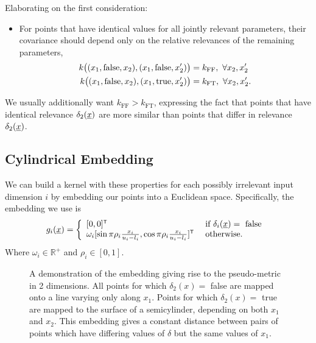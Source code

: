 \documentclass{article}
\newcommand{\vect}[1]{\underline{\smash{#1}}}
\renewcommand{\v}[1]{\vect{#1}}
\newcommand{\reals}{\mathds{R}}
\newcommand{\sX}{\mathcal{X}}
\newcommand{\br}{}%
\newcommand\transpose{{\textrm{\tiny{\sf{T}}}}}
\newcommand{\embeddingletter}{g}
\begin{document}
Elaborating on the first consideration:
%
\begin{itemize}[leftmargin=0.8cm]
\item For points that have identical values for all jointly relevant parameters, their covariance should depend only on the relative relevances of the remaining parameters,
\begin{align}
 k\bigl((x_1, \textnormal{false}, x_2), (x_1, \textnormal{false}, x_2') \bigr)
& = k_{\text{FF}},\ \forall x_2, x_2'\\
 k\bigl((x_1, \textnormal{false}, x_2), (x_1, \textnormal{true}, x_2') \bigr)
& = k_{\text{FT}},\ \forall x_2, x_2'.
\end{align}
\end{itemize}
We usually additionally want $k_{\text{FF}}>k_{\text{FT}}$, expressing the fact that points that have identical relevance $\delta_2({\v{x}})$ are more similar than points that differ in relevance $\delta_2({\v{x}})$.


\subsection{Cylindrical Embedding}
\vspace{-0.05in} 

We can build a kernel with these properties for each possibly irrelevant input dimension $i$ by embedding our points into a Euclidean space.  Specifically, the embedding we use is
%
%
%
\begin{equation}
\embeddingletter_i\br(\v{x}) = \left\{\begin{array}{ll}
[0,0]^\transpose & \textrm{ if } \delta_i(\v{x}) = \textrm{ false }\\
\omega_i [\sin{\pi\rho_i\frac{x_i}{u_i-l_i}}, \cos{\pi\rho_i\frac{x_i}{u_i-l_i}}]^\transpose & \textrm{ otherwise.}\end{array}\right.
\end{equation}
Where $\omega_i \in \mathbb{R}^+$ and $\rho_i \in [0,1]$.
%
\begin{figure}

\caption{A demonstration of the embedding giving rise to the pseudo-metric in 2 dimensions.  All points for which $\delta_2(x) =$ false are mapped onto a line varying only along $x_1$.  Points for which $\delta_2(x) =$ true are mapped to the surface of a semicylinder, depending on both $x_1$ and $x_2$.  This embedding gives a constant distance between pairs of points which have differing values of $\delta$ but the same values of $x_1$.
}
\label{fig:cylinder}
\end{figure}
\end{document}
